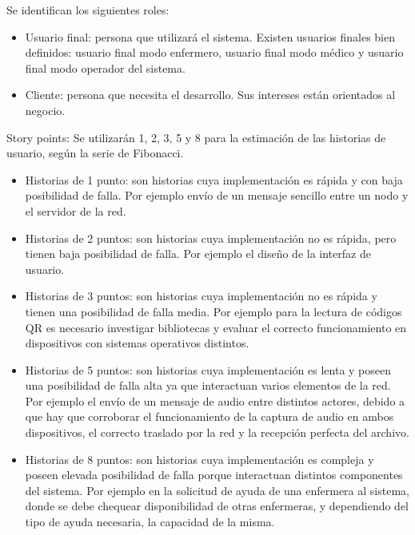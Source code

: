 \documentclass[
11pt, %
]{charter}
\begin{document}


Se identifican los siguientes roles:
\begin{itemize}
	\item Usuario final: persona que utilizará el sistema. Existen  usuarios finales bien definidos: usuario final modo enfermero, usuario final modo médico y usuario final modo operador del sistema.
	\item Cliente: persona que necesita el desarrollo. Sus intereses están orientados al negocio.

\end{itemize}

Story points:
Se utilizarán 1, 2, 3, 5 y 8 para la estimación de las historias de usuario, según la serie de Fibonacci.
\begin{itemize}
	\item Historias de 1 punto: son historias cuya implementación es rápida 	y con baja posibilidad de falla. Por ejemplo envío de un mensaje 			sencillo entre un nodo y el servidor de la red.
	\item Historias de 2 puntos: son historias cuya implementación no es rápida, pero tienen baja posibilidad de falla. Por ejemplo el diseño de la interfaz de usuario.
	\item Historias de 3 puntos: son historias cuya implementación no es rápida y tienen una posibilidad de falla media. Por ejemplo para la lectura de códigos QR es necesario investigar bibliotecas y evaluar el correcto funcionamiento en dispositivos con sistemas operativos distintos.
	\item Historias de 5 puntos: son historias cuya implementación es lenta y poseen una posibilidad de falla alta ya que interactuan varios elementos de la red. Por ejemplo el envío de un mensaje de audio entre distintos actores, debido a que hay que corroborar el funcionamiento de la captura de audio en ambos dispositivos, el correcto traslado por la red y la recepción perfecta del archivo.
	\item Historias de 8 puntos: son historias cuya implementación es compleja y poseen  elevada posibilidad de falla porque interactuan distintos componentes del sistema. Por ejemplo en la solicitud de ayuda de una enfermera al sistema, donde se debe chequear disponibilidad de otras enfermeras, y dependiendo del tipo de ayuda necesaria, la capacidad de la misma.

\end{itemize}
\end{document}
